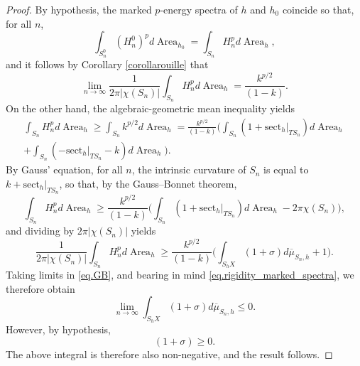 \documentclass[JEP,XML,SOM,Unicode,NoEqCountersInSection,published]{cedram}
\theoremstyle{plain}
\theoremstyle{definition}
\newcommand{\sect}{\mathrm{sect}}
\DeclareMathOperator{\Area}{Area}
\begin{document}
\begin{proof}
By hypothesis, the marked $p$-energy spectra of $h$ and $h_0$ coincide so that, for all $n$,\vspace*{-3pt}
\begin{equation*}
\int_{S^0_n}(H_n^0)^p d\Area_{h_0}=\int_{S_n} H_n^p d\Area_{h},
\end{equation*}
and it follows by Corollary \ref{corollarouille} that\vspace*{-3pt}
\begin{equation}\label{eq.rigidity_marked_spectra}
\lim_{n\to\infty}\frac{1}{2\pi|\chi(S_n)|}\int_{S_n} H_n^p d\Area_{h}=\frac{k^{p/2}}{(1-k)}.
\end{equation}
On the other hand, the algebraic-geometric mean inequality yields\vspace*{-3pt}
\begin{multline*}
\int_{S_n} H_n^p d\Area_{h}\geq\int_{S_n} k^{p/2}d\Area_{h}=\frac{k^{p/2}}{(1-k)}\biggl(\int_{S_n}(1+\sect_h|_{TS_n})d\Area_{h}\\[-3pt]
+ \int_{S_n} (-\sect_h|_{TS_n} - k)d\Area_{h}\biggr).
\end{multline*}
By Gauss' equation, for all $n$, the intrinsic curvature of $S_n$ is equal to $k+\sect_h|_{TS_n}$, so that, by the Gauss--Bonnet theorem,\vspace*{-3pt}
\begin{equation*}
\int_{S_n} H_n^p d\Area_{h} \geq \frac{k^{p/2}}{(1-k)}\biggl(\int_{S_n}(1+\sect_h|_{TS_n})d\Area_{h} - 2\pi\chi(S_n)\biggr),
\end{equation*}
and dividing by $2\pi\left|\chi(S_n)\right|$ yields\vspace*{-3pt}
\begin{equation}\label{eq.GB}
\frac{1}{2\pi|\chi(S_n)|}\int_{S_n} H_n^p d\Area_{h}\geq \frac{k^{p/2}}{(1-k)}\biggl(\int_{S_hX}(1+\sigma)d\overline\mu_{S_n,h}+1\biggr).
\end{equation}
Taking limits in \eqref{eq.GB}, and bearing in mind \eqref{eq.rigidity_marked_spectra}, we therefore obtain\vspace*{-3pt}
\begin{equation*}
\lim_{n\to\infty}\int_{S_hX}(1+\sigma)d\overline\mu_{S_n,h}\leq 0.
\end{equation*}
However, by hypothesis,
\begin{equation*}
(1+\sigma)\geq 0.
\end{equation*}
The above integral is therefore also non-negative, and the result follows.
\end{proof}
\end{document}
